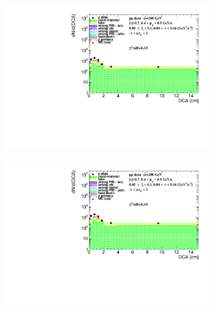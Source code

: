 \begin{figure}[h!]
\begin{subfigure}{.45\textwidth}
	\end{subfigure}
	\begin{subfigure}{.45\textwidth}
		\includegraphics[width=\linewidth, page=10]{chapters/chrgSTAR/img/DCAproton/background_p_1.pdf}
	\end{subfigure}
	\begin{subfigure}{.45\textwidth}
		\includegraphics[width=\linewidth, page=13]{chapters/chrgSTAR/img/DCAproton/background_p_1.pdf}
	\end{subfigure}
	\begin{subfigure}{.45\textwidth}

\end{subfigure}
\end{figure}
